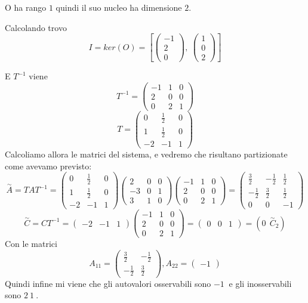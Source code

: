 \documentclass{article}
\begin{document}
O ha rango $ 1 $ quindi il suo nucleo ha dimensione $ 2 $.

Calcolando trovo \[ 
I = ker(O) = \left[ \left(\begin{matrix}-1\\2\\0\end{matrix}\right), \  \left(\begin{matrix}1\\0\\2\end{matrix}\right)\right]\]

E $T^{-1}$ viene \[ 
T^{-1} = \left(\begin{matrix}-1 & 1 & 0\\2 & 0 & 0\\0 & 2 & 1\end{matrix}\right) \]
\[ 
T = \left(\begin{matrix}0 & \frac{1}{2} & 0\\1 & \frac{1}{2} & 0\\-2 & -1 & 1\end{matrix}\right) \]Calcoliamo allora le matrici del sistema, e vedremo che risultano partizionate come avevamo previsto:
\[ 
\overset{\sim}{A} = T A  T^{-1} = \left(\begin{matrix}0 & \frac{1}{2} & 0\\1 & \frac{1}{2} & 0\\-2 & -1 & 1\end{matrix}\right)\left(\begin{matrix}2 & 0 & 0\\-3 & 0 & 1\\3 & 1 & 0\end{matrix}\right)\left(\begin{matrix}-1 & 1 & 0\\2 & 0 & 0\\0 & 2 & 1\end{matrix}\right) = \left(\begin{matrix}\frac{3}{2} & - \frac{1}{2} & \frac{1}{2}\\- \frac{1}{2} & \frac{3}{2} & \frac{1}{2}\\0 & 0 & -1\end{matrix}\right) \]
\[ 
\overset{\sim}{C} = CT^{-1} = \left(\begin{matrix}-2 & -1 & 1\end{matrix}\right)\left(\begin{matrix}-1 & 1 & 0\\2 & 0 & 0\\0 & 2 & 1\end{matrix}\right) = \left(\begin{matrix}0 & 0 & 1\end{matrix}\right) = ( 0\ \ \overset{\sim}{C}_2) \]
Con le matrici \[ A_{11} = \left(\begin{matrix}\frac{3}{2} & - \frac{1}{2}\\- \frac{1}{2} & \frac{3}{2}\end{matrix}\right) , A_{22} = \left(\begin{matrix}-1\end{matrix}\right) \]Quindi infine mi viene che gli autovalori osservabili sono $ -1\  $ e gli inosservabili sono $ 2\ 1\  $.
\end{document}
